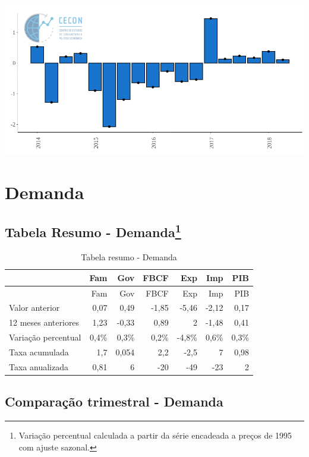 \documentclass[11pt,portuguese,]{article}
\let\rmarkdownfootnote\footnote%
\def\footnote{\protect\rmarkdownfootnote}
\begin{document}
\begin{center}\includegraphics[width=1\linewidth]{Grafico_VA} \end{center}

\section{Demanda}\label{demanda}

\subsection[Tabela Resumo - Demanda]{\texorpdfstring{Tabela Resumo -
Demanda\footnote{Variação percentual calculada a partir da série
  encadeada a preços de 1995 com ajuste sazonal.}}{Tabela Resumo - Demanda}}\label{tabela-resumo---demanda4}

\begin{longtable}[]{@{}lrrrrrr@{}}
\caption{Tabela resumo - Demanda}\tabularnewline
\toprule
& Fam & Gov & FBCF & Exp & Imp & PIB\tabularnewline
\midrule
\endfirsthead
\toprule
& Fam & Gov & FBCF & Exp & Imp & PIB\tabularnewline
\midrule
\endhead
Valor anterior & 0,07 & 0,49 & -1,85 & -5,46 & -2,12 &
0,17\tabularnewline
12 meses anteriores & 1,23 & -0,33 & 0,89 & 2 & -1,48 &
0,41\tabularnewline
Variação percentual & 0,4\% & 0,3\% & 0,2\% & -4,8\% & 0,6\% &
0,3\%\tabularnewline
Taxa acumulada & 1,7 & 0,054 & 2,2 & -2,5 & 7 & 0,98\tabularnewline
Taxa anualizada & 0,81 & 6 & -20 & -49 & -23 & 2\tabularnewline
\bottomrule
\end{longtable}

\subsection{Comparação trimestral -
Demanda}\label{comparacao-trimestral---demanda}
\end{document}
